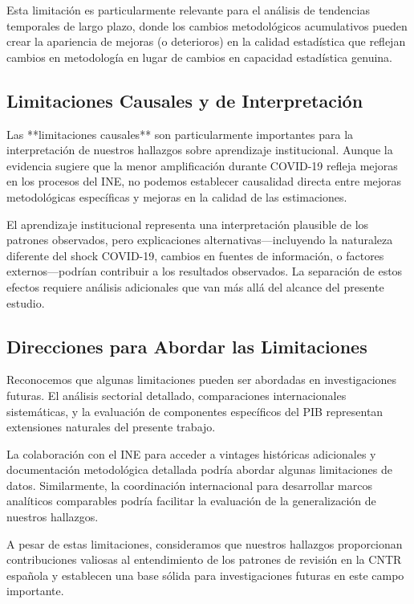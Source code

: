 \documentclass[12pt,a4paper]{article}
\begin{document}
Esta limitación es particularmente relevante para el análisis de tendencias temporales de largo plazo, donde los cambios metodológicos acumulativos pueden crear la apariencia de mejoras (o deterioros) en la calidad estadística que reflejan cambios en metodología en lugar de cambios en capacidad estadística genuina.

\subsection{Limitaciones Causales y de Interpretación}

Las **limitaciones causales** son particularmente importantes para la interpretación de nuestros hallazgos sobre aprendizaje institucional. Aunque la evidencia sugiere que la menor amplificación durante COVID-19 refleja mejoras en los procesos del INE, no podemos establecer causalidad directa entre mejoras metodológicas específicas y mejoras en la calidad de las estimaciones.

El aprendizaje institucional representa una interpretación plausible de los patrones observados, pero explicaciones alternativas—incluyendo la naturaleza diferente del shock COVID-19, cambios en fuentes de información, o factores externos—podrían contribuir a los resultados observados. La separación de estos efectos requiere análisis adicionales que van más allá del alcance del presente estudio.

\subsection{Direcciones para Abordar las Limitaciones}

Reconocemos que algunas limitaciones pueden ser abordadas en investigaciones futuras. El análisis sectorial detallado, comparaciones internacionales sistemáticas, y la evaluación de componentes específicos del PIB representan extensiones naturales del presente trabajo.

La colaboración con el INE para acceder a vintages históricas adicionales y documentación metodológica detallada podría abordar algunas limitaciones de datos. Similarmente, la coordinación internacional para desarrollar marcos analíticos comparables podría facilitar la evaluación de la generalización de nuestros hallazgos.

A pesar de estas limitaciones, consideramos que nuestros hallazgos proporcionan contribuciones valiosas al entendimiento de los patrones de revisión en la CNTR española y establecen una base sólida para investigaciones futuras en este campo importante.
\end{document}
